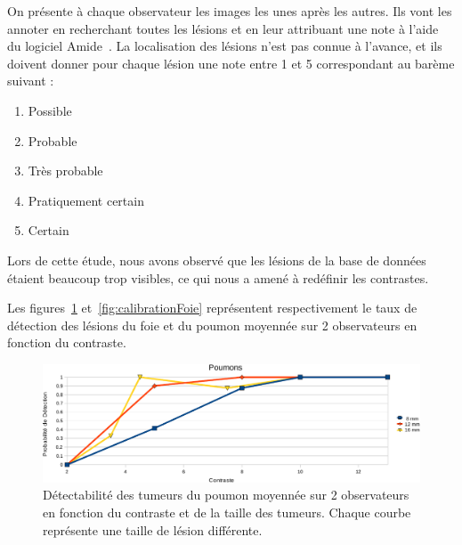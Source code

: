 On présente à chaque observateur les images les unes après les autres. Ils vont les annoter en recherchant toutes les lésions et en leur attribuant une note à l'aide du logiciel Amide~\cite{loening2003amide}. La localisation des lésions n'est pas connue à l'avance, et ils doivent donner pour chaque lésion une note entre 1 et 5 correspondant au barème suivant :

\begin{enumerate}
\item Possible
\item Probable
\item Très probable
\item Pratiquement  certain
\item Certain
\end{enumerate}

Lors de cette étude, nous avons observé que les lésions de la base de données étaient beaucoup trop visibles, ce qui nous a amené à redéfinir les contrastes. 


Les figures~\ref{fig:calibration} et~\ref{fig:calibrationFoie}  représentent respectivement le taux de détection des lésions du foie et du poumon moyennée sur 2 observateurs en fonction du contraste.


\begin{figure}[h!]
\begin{center}
\includegraphics[width=15cm]{images/calibration_crop}
\end{center}
\caption[Détectabilité des tumeurs du poumon en fonction du contraste et de la taille des tumeurs]{Détectabilité des tumeurs du poumon moyennée sur 2 observateurs en fonction du contraste et de la taille des tumeurs. Chaque courbe représente une taille de lésion différente.} 
\label{fig:calibration}
\end{figure}

